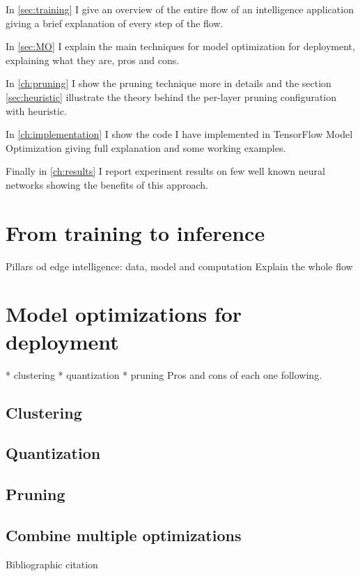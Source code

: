 
In \autoref{sec:training} I give an overview of the entire flow of an
intelligence application giving a brief explanation of every step of the flow.

In \autoref{sec:MO} I explain the main techniques for model optimization for
deployment, explaining what they are, pros and cons.

In \autoref{ch:pruning} I show the pruning technique more in details and
the section \autoref{sec:heuristic} illustrate the theory behind the per-layer
pruning configuration with heuristic.

In \autoref{ch:implementation} I show the code I have implemented in
TensorFlow Model Optimization giving full explanation and some working
examples.

Finally in \autoref{ch:results} I report experiment results on few well known
neural networks showing the benefits of this approach.

\section{From training to inference}\label{sec:training}

Pillars od edge intelligence: data, model and computation
Explain the whole flow
\lipsum[1]

\section{Model optimizations for deployment}\label{sec:MO}
* clustering
* quantization
* pruning
Pros and cons of each one following.
\lipsum[1]

\subsection{Clustering}
\lipsum[1]

\subsection{Quantization}
\lipsum[1]

\subsection{Pruning}
\lipsum[1]

\subsection{Combine multiple optimizations}
\lipsum[1]

Bibliographic citation
